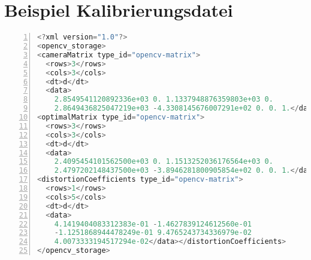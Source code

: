 \section{Beispiel Kalibrierungsdatei}\label{appendix:opencv_filestorage_example}
\begin{lstlisting}[language=c++, numbers=left, breaklines=true, breakatwhitespace=false]
<?xml version="1.0"?>
<opencv_storage>
<cameraMatrix type_id="opencv-matrix">
  <rows>3</rows>
  <cols>3</cols>
  <dt>d</dt>
  <data>
    2.8549541120892336e+03 0. 1.1337948876359803e+03 0.
    2.8649436825047219e+03 -4.3308145676007291e+02 0. 0. 1.</data></cameraMatrix>
<optimalMatrix type_id="opencv-matrix">
  <rows>3</rows>
  <cols>3</cols>
  <dt>d</dt>
  <data>
    2.4095454101562500e+03 0. 1.1513252036176564e+03 0.
    2.4797202148437500e+03 -3.8946281800905854e+02 0. 0. 1.</data></optimalMatrix>
<distortionCoefficients type_id="opencv-matrix">
  <rows>1</rows>
  <cols>5</cols>
  <dt>d</dt>
  <data>
    4.1419404083312383e-01 -1.4627839124612560e-01
    -1.1251868944478249e-01 9.4765243734336979e-02
    4.0073333194517294e-02</data></distortionCoefficients>
</opencv_storage>
\end{lstlisting}